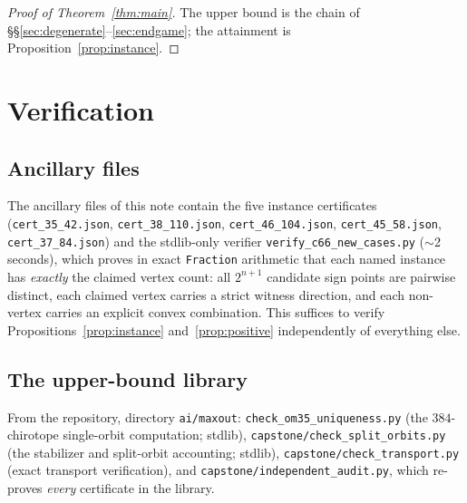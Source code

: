 \documentclass[11pt]{amsart}
\theoremstyle{remark}
\begin{document}
\begin{proof}[Proof of Theorem~\ref{thm:main}]
The upper bound is the chain of
\S\S\ref{sec:degenerate}--\ref{sec:endgame}; the attainment is
Proposition~\ref{prop:instance}.
\end{proof}

\section{Verification}\label{sec:verification}

\subsection*{Ancillary files}
\sloppy
The ancillary files of this note contain the five instance certificates
(\texttt{cert\_35\_42.json}, \texttt{cert\_38\_110.json},
\texttt{cert\_46\_104.json}, \texttt{cert\_45\_58.json},
\texttt{cert\_37\_84.json}) and the stdlib-only verifier
\texttt{verify\_c66\_new\_cases.py} ($\sim$2 seconds), which proves in
exact \texttt{Fraction} arithmetic that each named instance has
\emph{exactly} the claimed vertex count: all $2^{n+1}$ candidate sign
points are pairwise distinct, each claimed vertex carries a strict
witness direction, and each non-vertex carries an explicit convex
combination. This suffices to verify Propositions~\ref{prop:instance}
and~\ref{prop:positive} independently of everything else.

\subsection*{The upper-bound library}
From the repository, directory \texttt{ai/maxout}:
\texttt{check\_om35\_uniqueness.py} (the $384$-chirotope single-orbit
computation; stdlib), \texttt{capstone/check\_split\_orbits.py} (the
stabilizer and split-orbit accounting; stdlib),
\texttt{capstone/check\_transport.py} (exact transport verification),
and \texttt{capstone/independent\_audit.py}, which re-proves
\emph{every} certificate in the library.
\end{document}
